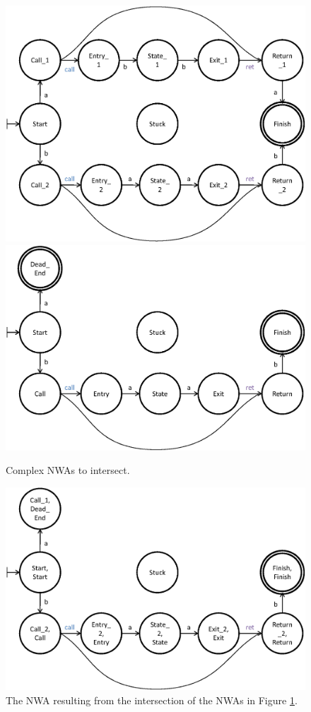 \documentclass{llncs}
\begin{document}
\begin{figure}[p]
  \centering
    \includegraphics[width=12cm]{Figures/Figure7a.eps}
    \includegraphics[width=12cm]{Figures/Figure7b.eps}
  \caption{Complex NWAs to intersect.}
  \label{Fig:Intersect3}
\end{figure}

\begin{figure}[p]
  \centering
    \includegraphics[width=12cm]{Figures/Figure8.eps}
  \caption{The NWA resulting from the intersection of the NWAs in Figure \ref{Fig:Intersect3}.}
  \label{Fig:Intersect4}
\end{figure}
\end{document}
